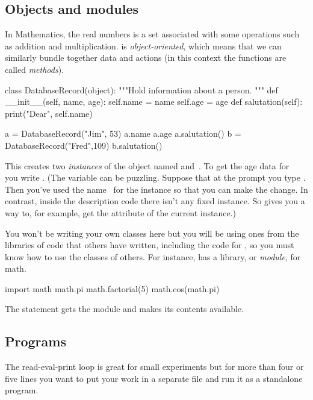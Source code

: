 \subsection{Objects and modules}
In Mathematics, the real numbers is a set associated with some operations
such as addition and multiplication.
\python{} is \textit{object-oriented}, which means that we can similarly bundle
together data and actions (in this context the functions are called 
\textit{methods}).
\begin{pythonconsole}
class DatabaseRecord(object):
    """Hold information about a person.
    """
    def __init__(self, name, age):
        self.name = name
        self.age = age
    def salutation(self):
        print("Dear", self.name)

a = DatabaseRecord("Jim", 53)
a.name
a.age
a.salutation()
b = DatabaseRecord("Fred",109)
b.salutation()
\end{pythonconsole}
\noindent
This creates two \textit{instances} of the object 
 named  and~.
To get the age data for~
you write 
.
(The \protect{} variable 
can  be puzzling.
Suppose that at the prompt you type .
Then you've used the name~ 
for the instance so that you can
make the change.
In contrast,
inside the  description code there isn't any fixed instance. 
So  gives you a way to, for example, 
get the  attribute
of the current instance.)

You won't be writing your own classes here 
but you will be using ones from
the libraries of code that others have written, including the
code for \Sage, so you must know how to use the classes of others. 
For instance, \python{} has a library, or \textit{module}, for math.
\begin{pythonconsole}
import math
math.pi
math.factorial(5)
math.cos(math.pi)
\end{pythonconsole}
\noindent
The  statement gets the module and makes
its contents available.





\subsection{Programs}
The read-eval-print loop is great for small experiments but
for more than four or five lines you 
want to put your work in a separate file and run it as a standalone program.


